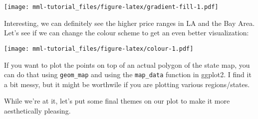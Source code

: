 \documentclass[]{book}
\newenvironment{Shaded}{\begin{snugshade}}{\end{snugshade}}
\newcommand{\KeywordTok}[1]{\textcolor[rgb]{0.13,0.29,0.53}{\textbf{#1}}}
\newcommand{\DataTypeTok}[1]{\textcolor[rgb]{0.13,0.29,0.53}{#1}}
\newcommand{\FloatTok}[1]{\textcolor[rgb]{0.00,0.00,0.81}{#1}}
\newcommand{\StringTok}[1]{\textcolor[rgb]{0.31,0.60,0.02}{#1}}
\newcommand{\OperatorTok}[1]{\textcolor[rgb]{0.81,0.36,0.00}{\textbf{#1}}}
\newcommand{\NormalTok}[1]{#1}
\theoremstyle{definition}
\theoremstyle{definition}
\theoremstyle{definition}
\theoremstyle{remark}
\begin{document}
\texttt{[image: mml-tutorial\_files/figure-latex/gradient-fill-1.pdf]}

Interesting, we can definitely see the higher price ranges in LA and the
Bay Area. Let's see if we can change the colour scheme to get an even
better visualization:

\begin{Shaded}
\end{Shaded}

\texttt{[image: mml-tutorial\_files/figure-latex/colour-1.pdf]}

If you want to plot the points on top of an actual polygon of the state
map, you can do that using \texttt{geom\_map} and using the
\texttt{map\_data} function in ggplot2. I find it a bit messy, but it
might be worthwile if you are plotting various regions/states.

While we're at it, let's put some final themes on our plot to make it
more aesthetically pleasing.
\end{document}
